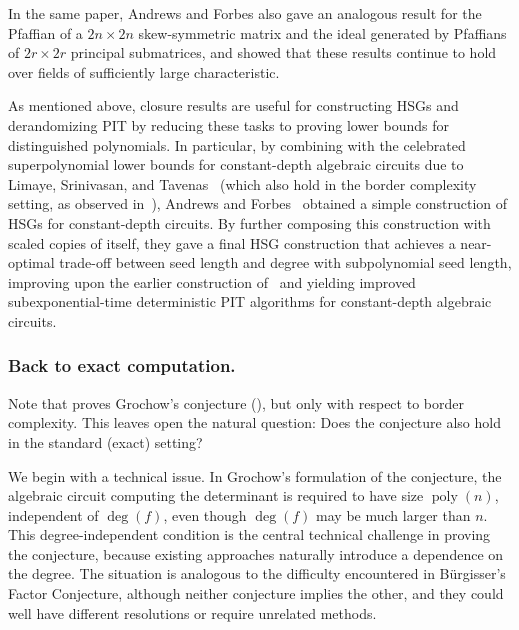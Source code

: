 \documentclass[10pt,a4paper]{amsart}
\DeclareMathOperator{\poly}{poly}
\begin{document}
In the same paper, Andrews and Forbes also gave an analogous result for the Pfaffian of a $2n \times 2n$ skew-symmetric matrix and the ideal generated by Pfaffians of $2r \times 2r$ principal submatrices, and showed that these results continue to hold over fields of sufficiently large characteristic.

As mentioned above, closure results are useful for constructing HSGs and derandomizing PIT by reducing these tasks to proving lower bounds for distinguished polynomials.
In particular, by combining  with the celebrated superpolynomial lower bounds for constant-depth algebraic circuits due to Limaye, Srinivasan, and Tavenas~\cite{LST25} (which also hold in the border complexity setting, as observed in~\cite{AF21}), Andrews and Forbes~\cite{AF21} obtained a simple construction of HSGs for constant-depth circuits.
By further composing this construction with scaled copies of itself, they gave a final HSG construction that achieves a near-optimal trade-off between seed length and degree with subpolynomial seed length, improving upon the earlier construction of~\cite{CKS19} and yielding improved subexponential-time deterministic PIT algorithms for constant-depth algebraic circuits.

\subsubsection*{Back to exact computation.}

Note that  proves Grochow's conjecture (), but only with respect to border complexity.
This leaves open the natural question: Does the conjecture also hold in the standard (exact) setting?

We begin with a technical issue.
In Grochow's formulation of the conjecture, the algebraic circuit computing the determinant is required to have size $\poly(n)$, independent of $\deg(f)$, even though $\deg(f)$ may be much larger than $n$.
This degree-independent condition is the central technical challenge in proving the conjecture, because existing approaches naturally introduce a dependence on the degree.
The situation is analogous to the difficulty encountered in Bürgisser’s Factor Conjecture, although neither conjecture implies the other, and they could well have different resolutions or require unrelated methods.
\end{document}

